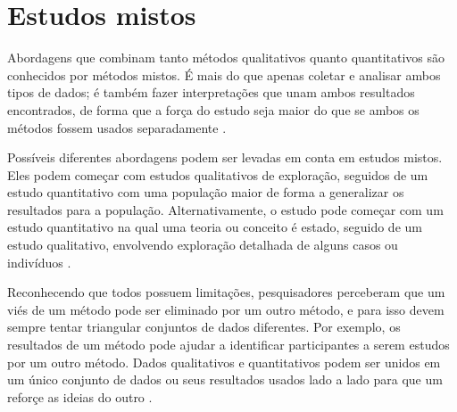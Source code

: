 \section{Estudos mistos}

Abordagens que combinam tanto métodos qualitativos quanto quantitativos são conhecidos por métodos mistos. 
É mais do que apenas coletar e analisar ambos tipos de dados; é também fazer interpretações que unam ambos
resultados encontrados, de forma que a força do estudo seja maior do que se ambos os métodos fossem
usados separadamente \cite{creswell}.

Possíveis diferentes abordagens podem ser levadas em conta em estudos mistos. Eles podem começar com estudos
qualitativos de exploração, seguidos de um estudo quantitativo com uma população maior de forma a
generalizar os resultados para a população. Alternativamente, o estudo pode começar com um estudo quantitativo
na qual uma teoria ou conceito é estado, seguido de um estudo qualitativo, envolvendo exploração detalhada
de alguns casos ou indivíduos \cite{creswell}.

Reconhecendo que todos possuem limitações, pesquisadores perceberam que um viés de um método pode ser eliminado
por um outro método, e para isso devem sempre tentar triangular conjuntos de dados diferentes.
Por exemplo, os resultados de um método pode ajudar a identificar participantes a serem estudos por um outro método.
Dados qualitativos e quantitativos podem ser unidos em um único conjunto de dados ou seus resultados usados
lado a lado para que um reforçe as ideias do outro \cite{creswell}.
